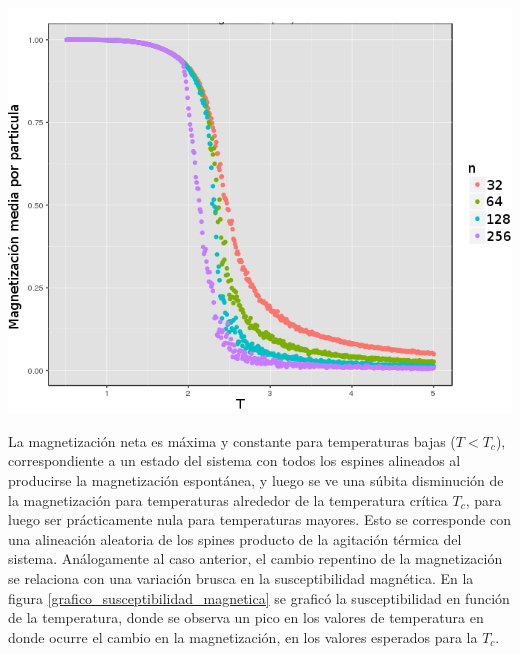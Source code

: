 \documentclass[%
 reprint,
 amsmath,amssymb,
 aps,
spanish]{revtex4-1}
\begin{document}
\begin{minipage}{0.45\textwidth}									
\centering
\includegraphics[totalheight=0.25\textheight]{imagenes/con_corona/magnetizacion.png}
\label{fig:magnetizacion_con_corona}
\end{minipage}

La magnetización neta es máxima y constante para temperaturas bajas ($T<T_c$), correspondiente a un estado del sistema con todos
los espines alineados al producirse la magnetización espontánea, y luego se ve una súbita disminución de la magnetización
para temperaturas alrededor de la temperatura crítica $T_c$, para luego ser prácticamente nula para temperaturas mayores. Esto se corresponde con una alineación aleatoria de los spines producto de la agitación térmica del sistema.
Análogamente al caso anterior, el cambio repentino de la magnetización se relaciona con una variación brusca en la susceptibilidad magnética. En la
figura \ref{grafico_susceptibilidad_magnetica} se graficó la susceptibilidad en función de la temperatura, donde se observa un pico en los valores de temperatura en donde ocurre el cambio en la magnetización, en los valores esperados para la $T_c$.
\end{document}
